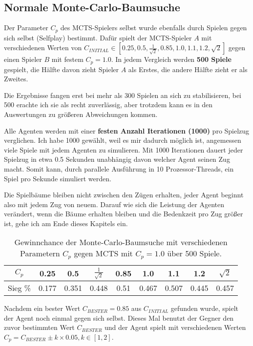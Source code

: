 \subsection{Normale Monte-Carlo-Baumsuche}
\label{chap:results-mcts}

Der Parameter $C_p$ des MCTS-Spielers selbst wurde ebenfalls durch Spielen gegen sich selbst (Selfplay) bestimmt.
Dafür spielt der MCTS-Spieler $A$ mit verschiedenen Werten von $C_{INITIAL}\in \left[0.25, 0.5, \frac{1}{\sqrt{2}}, 0.85, 1.0, 1.1, 1.2, \sqrt{2}\right]$ gegen einen Spieler $B$ mit festem $C_p=1.0$.
In jedem Vergleich werden \textbf{500 Spiele} gespielt, die Hälfte davon zieht Spieler $A$ als Erstes, die andere Hälfte zieht er als Zweites.

Die Ergebnisse fangen erst bei mehr als 300 Spielen an sich zu stabilisieren, bei 500 erachte ich sie als recht zuverlässig, aber trotzdem kann es in den Auswertungen zu größeren Abweichungen kommen.

Alle Agenten werden mit einer \textbf{festen Anzahl Iterationen (1000)} pro Spielzug verglichen. 
Ich habe 1000 gewählt, weil es mir dadurch möglich ist, angemessen viele Spiele mit jedem Agenten zu simulieren. 
Mit 1000 Iterationen dauert jeder Spielzug in etwa 0.5 Sekunden unabhängig davon welcher Agent seinen Zug macht.
Somit kann, durch parallele Ausführung in 10 Prozessor-Threads, ein Spiel pro Sekunde simuliert werden.

Die Spielbäume bleiben nicht zwischen den Zügen erhalten, jeder Agent beginnt also mit jedem Zug von neuem.
Darauf wie sich die Leistung der Agenten verändert, wenn die Bäume erhalten bleiben und die Bedenkzeit pro Zug größer ist, gehe ich am Ende dieses Kapitels ein.

\medskip
\begin{table}[h!]
\centering
\begin{tabular}{|c||c|c|c|c|c|c|c|c|}
\hline
$C_p$ & 0.25 & 0.5 & $\frac{1}{\sqrt{2}}$ & 0.85 & 1.0 & 1.1 & 1.2 & $\sqrt{2}$ \\
\hline
Sieg \% & 0.177 & 0.351 & 0.448 & 0.51 & 0.467 & 0.507 & 0.445 & 0.457 \\
\hline
\end{tabular}
\caption{Gewinnchance der Monte-Carlo-Baumsuche mit verschiedenen Parametern $C_p$ gegen MCTS mit $C_p=1.0$ über 500 Spiele.}
\label{tab:mcts-cp-1}
\end{table}

\medskip
Nachdem ein bester Wert $C_{BESTER}=0.85$ aus $C_{INITIAL}$ gefunden wurde, spielt der Agent noch einmal gegen sich selbst.
Dieses Mal benutzt der Gegner den zuvor bestimmten Wert $C_{BESTER}$ und der Agent spielt mit verschiedenen Werten $C_p = C_{BESTER} \pm k \times 0.05, k \in \left[1,2\right] $.

